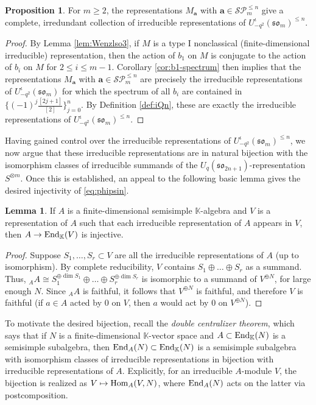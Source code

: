 \documentclass[10pt]{amsart}
\numberwithin{equation}{section}
\theoremstyle{definition}
\newtheorem{lem}[thm]{Lemma}
\newtheorem{prop}[thm]{Proposition}
\newcommand{\Hom}{{\rm Hom}}
\newcommand{\End}{{\rm End}}
\def\K{{\mathbb K}}
\newcommand{\son}[1][2n+1]{\mathfrak{so}_{#1}}
\newcommand{\som}[1][m]{\mathfrak{so}_{#1}}
\newcommand{\ot}{\otimes}
\newcommand{\iqUsom}[1][m]{{U}^{\iota}_{-q^2}(\som[#1])}
\newcommand{\ab}{\mathbf{a}}
\newcommand{\SP}{\mathcal{SP}}
\begin{document}
\begin{prop}\label{prop:repsofiQn}
For $m \ge 2$, the representations $M_{\ab}$ with $\ab \in \SP_m^{\le n}$ 
give a complete, irredundant collection of irreducible representations of $\iqUsom^{\le n}$. 
\end{prop}
\begin{proof} 
By Lemma \ref{lem:Wenzlso3}, if $M$ is a type I nonclassical (finite-dimensional irreducible) representation, 
then the action of $b_1$ on $M$ is conjugate to the action of $b_i$ on $M$ for $2\leq i \leq m-1$. 
Corollary \ref{cor:b1-spectrum} then implies that the representations $M_{\ab}$ with $\ab\in \SP_m^{\le n}$ 
are precisely the irreducible representations of $\iqUsom$ for which the spectrum of all $b_i$ are 
contained in $\{ (-1)^j \frac{[2j+1]}{[2]} \}_{j=0}^{n}$.
By Definition \ref{def:iQn}, these are exactly the irreducible representations of $\iqUsom^{\leq n}$.
\end{proof}

Having gained control over the irreducible representations of $\iqUsom^{\le n}$, 
we now argue that these irreducible representations are in natural bijection 
with the isomorphism classes of irreducible summands of the $U_q(\son)$-representation $S^{\ot m}$.
Once this is established, an appeal to the following basic lemma gives the desired injectivity of \eqref{eq:phipsin}.

\begin{lem}\label{lem:fullforssisfaithful}
If $A$ is a finite-dimensional semisimple $\K$-algebra 
and $V$ is a representation of $A$ such that each irreducible representation of $A$ appears in $V$, 
then $A\rightarrow \End_{\K}(V)$ is injective.
\end{lem}
\begin{proof}
Suppose $S_1, \dots, S_r\subset V$ are all the irreducible representations of $A$ (up to isomorphism). 
By complete reducibility, $V$ contains $S_1\oplus \dots \oplus S_r$ as a summand. 
Thus, ${}_AA \cong S_1^{\oplus \dim S_1}\oplus \dots \oplus S_r^{\oplus \dim S_r}$ is isomorphic to a summand of $V^{\oplus N}$, 
for large enough $N$. 
Since ${}_AA$ is faithful, it follows that $V^{\oplus N}$ is faithful, 
and therefore $V$ is faithful (if $a \in A$ acted by $0$ on $V$, then $a$ would act by $0$ on $V^{\oplus N}$). 
\end{proof}

To motivate the desired bijection, recall the \emph{double centralizer theorem}, 
which says that if $N$ is a finite-dimensional $\K$-vector space and $A \subset \End_{\K}(N)$ is a semisimple subalgebra, 
then $\End_A(N) \subset \End_{\K}(N)$ is a semisimple subalgebra 
with isomorphism classes of irreducible representations in bijection with irreducible representations of $A$. 
Explicitly, for an irreducible $A$-module $V$, the bijection is realized as $V\mapsto \Hom_A(V, N)$, 
where $\End_A(N)$ acts on the latter via postcomposition.
\end{document}

